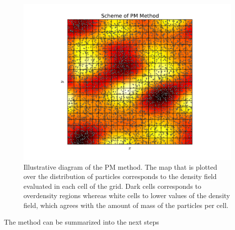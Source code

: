 \begin{figure}[htbp]
	\centering
	\includegraphics[width=1.00\textwidth]
	{./figures/3_nbody_simulations/PM_Method.pdf}

	\caption{\small{Illustrative diagram of the PM method. The map that is
	plotted over the distribution of particles corresponds to the density
	field evaluated in each cell of the grid. Dark cells corresponds to
	overdensity regions whereas white cells to lower values of the density 
	field, which agrees with the amount of mass of the particles per cell.}}
	
	\label{fig:MP_Method}
\end{figure}
\newpage
The method can be summarized into the next steps


